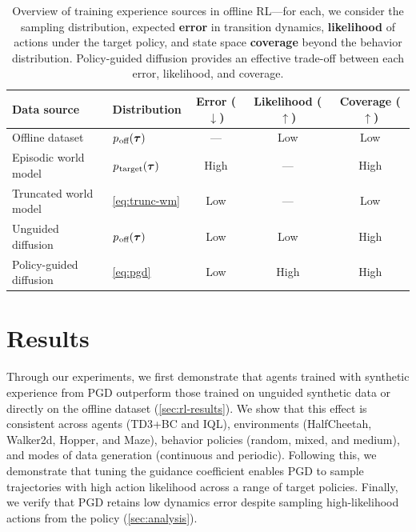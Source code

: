 \documentclass[10pt]{article} %
\theoremstyle{plain}
\theoremstyle{definition}
\theoremstyle{remark}
\newcommand{\ptarg}{p_{\mkern1mu\text{target}}}
\newcommand{\poff}{p_{\mkern1mu\text{off}}}
\begin{document}
\newcommand{\none}{\color{black}---}
\newcommand{\low}{\color{ForestGreen}Low}
\newcommand{\high}{\color{red}High}
\newcommand{\pmax}{\color{black}---}
\newcommand{\plow}{\color{red}Low}
\newcommand{\phigh}{\color{ForestGreen}High}
\renewcommand{\arraystretch}{1.1}
\begin{table}[hbt]
    \centering
    \caption{Overview of training experience sources in offline RL---for each, we consider the sampling distribution, expected \textbf{error} in transition dynamics, \textbf{likelihood} of actions under the target policy, and state space \textbf{coverage} beyond the behavior distribution. Policy-guided diffusion provides an effective trade-off between each error, likelihood, and coverage.}
    \begin{tabular}{@{}llccc@{}}
        \toprule
            \textbf{Data source} & \textbf{Distribution} & \textbf{Error ($\bm\downarrow$)} & \textbf{Likelihood ($\bm\uparrow$)} & \textbf{Coverage ($\bm\uparrow$)}\\
        \midrule
        Offline dataset & $\poff(\bm{\tau})$ & \none{} & \plow{} & \plow{} \\
        \cmidrule{2-5}
        Episodic world model & $\ptarg(\bm{\tau})$ & \high{} & \pmax{} & \phigh{} \\
        Truncated world model & \autoref{eq:trunc-wm} & \low{} & \pmax{} & \plow{} \\
        \cmidrule{2-5}
        Unguided diffusion & $\poff(\bm{\tau})$ & \low{} & \plow{} & \phigh{} \\
        Policy-guided diffusion & \autoref{eq:pgd} & \low{} & \phigh{} & \phigh{} \\
        \bottomrule
    \end{tabular}
    \label{tab:methods}
\end{table}
\renewcommand{\arraystretch}{1}









\section{Results\label{sec:results}}
Through our experiments, we first demonstrate that agents trained with synthetic experience from PGD outperform those trained on unguided synthetic data or directly on the offline dataset (\autoref{sec:rl-results}). We show that this effect is consistent across agents (TD3+BC and IQL), environments (HalfCheetah, Walker2d, Hopper, and Maze), behavior policies (random, mixed, and medium), and modes of data generation (continuous and periodic).
Following this, we demonstrate that tuning the guidance coefficient enables PGD to sample trajectories with high action likelihood across a range of target policies.
Finally, we verify that PGD retains low dynamics error despite sampling high-likelihood actions from the policy (\autoref{sec:analysis}).
\end{document}
